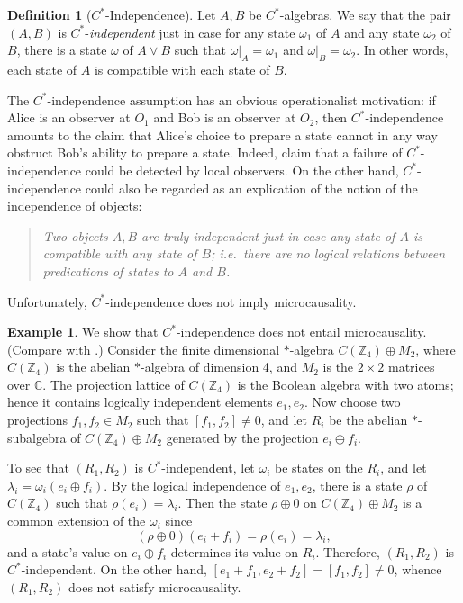 \documentclass[11pt]{article}
\theoremstyle{definition}
\theoremstyle{definition}
\newtheorem{defn}[thm]{Definition}
\newtheorem{example}[thm]{Example}
\theoremstyle{remark}
\def\7#1{{\mathbb #1}}
\def\om{\omega} \def\Om{\Omega} \def\dd{\partial} \def\D{\Delta}
\begin{document}
\begin{defn}[$C^*$-Independence] Let $A,B$ be $C^*$-algebras.  We say
  that the pair $(A,B)$ is $C^*$-\emph{independent} just in case for
  any state $\om _1$ of $A$ and any state $\om _2$ of $B$, there is a
  state $\om$ of $A\vee B$ such that $\om |_A=\om _1$ and $\om
  |_{B}=\om _2$.  In other words, each state of $A$ is compatible with
  each state of $B$.
\end{defn}

The $C^*$-independence assumption has an obvious operationalist
motivation: if Alice is an observer at $O_1$ and Bob is an observer at
$O_2$, then $C^*$-independence amounts to the claim that Alice's
choice to prepare a state cannot in any way obstruct Bob's ability to
prepare a state.  Indeed, \cite{sumbuc} claim that a failure of
$C^*$-independence could be detected by local observers.  On the other
hand, $C^*$-independence could also be regarded as an explication of
the notion of the independence of objects:
\begin{quote} \textit{Two objects $A,B$ are truly independent just in
    case any state of $A$ is compatible with any state of $B$; i.e.\
    there are no logical relations between predications of states to $A$ and
    $B$.}  \end{quote} 

Unfortunately, $C^*$-independence does not imply microcausality.

\begin{example} We show that $C^*$-independence does not entail
  microcausality.  (Compare with \cite{napi}.) Consider the finite
  dimensional $*$-algebra $C(\7Z _4)\oplus M_2$, where $C(\7Z _4)$ is
  the abelian $*$-algebra of dimension 4, and $M_2$ is the $2\times 2$
  matrices over $\7C$.  The projection lattice of $C(\7Z _4)$ is the
  Boolean algebra with two atoms; hence it contains logically
  independent elements $e_1,e_2$.  Now choose two projections
  $f_1,f_2\in M_2$ such that $[f_1,f_2]\neq 0$, and let $R_i$ be the
  abelian $*$-subalgebra of $C(\7Z _4)\oplus M_2$ generated by the
  projection $e_i\oplus f_i$.

  To see that $(R_1,R_2)$ is $C^*$-independent, let $\om _i$ be states
  on the $R_i$, and let $\lambda _i=\om _i(e_i\oplus f_i)$.  By the
  logical independence of $e_1,e_2$, there is a state $\rho$ of $C(\7Z
  _4)$ such that $\rho (e_i)=\lambda _i$.  Then the state $\rho \oplus
  0$ on $C(\7Z _4)\oplus M_2$ is a common extension of the $\om _i$
  since
$$ (\rho \oplus 0)(e_i+f_i)=\rho (e_i)=\lambda  _i ,$$
and a state's value on $e_i\oplus f_i$ determines its value on $R_i$.
Therefore, $(R_1,R_2)$ is $C^*$-independent.  On the other hand,
$[e_1+f_1,e_2+f_2]=[f_1,f_2]\neq 0$, whence $(R_1,R_2)$ does not
satisfy microcausality.
\end{example}
 
\end{document}
